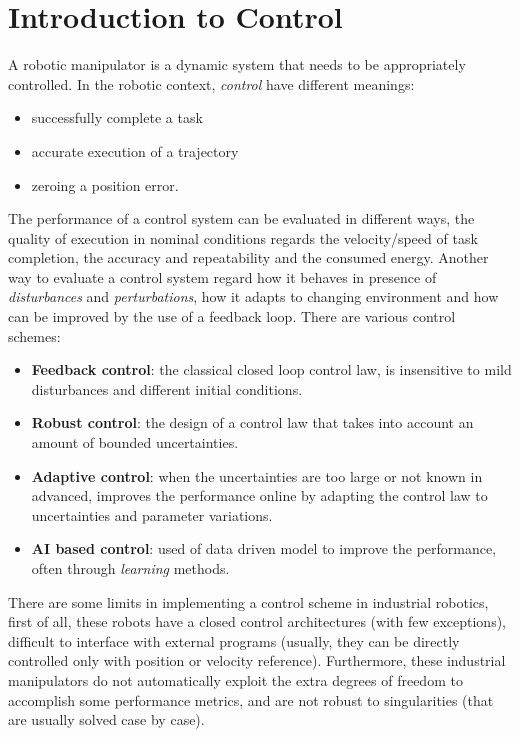 \documentclass[10pt, a4paper]{report}
\begin{document}
\chapter{Introduction to Control}
A robotic manipulator is a dynamic system that needs to be appropriately controlled. In the robotic context, \textit{control} have different meanings:\begin{itemize}
    \item successfully complete a task
    \item accurate execution of a trajectory 
    \item zeroing a position error. 
\end{itemize}
The performance of a control system can be evaluated in different ways, the quality of execution in nominal conditions regards the velocity/speed of task completion, the accuracy and repeatability and the consumed energy. Another way to evaluate a control system regard how it behaves in presence of \textit{disturbances} and \textit{perturbations}, how it adapts to changing environment and how can be improved by the use of a feedback loop. There are various control schemes:\begin{itemize}
    \item \textbf{Feedback control}: the classical closed loop control law, is insensitive to mild disturbances and different initial conditions.
    \item \textbf{Robust control}: the design of a control law that takes into account an amount of bounded uncertainties.
    \item \textbf{Adaptive control}: when the uncertainties are too large or not known in advanced, improves the performance online by adapting the control law to uncertainties and parameter variations.
    \item \textbf{AI based control}: used of data driven model to improve the performance, often through \textit{learning} methods.
\end{itemize}
There are some limits in implementing a control scheme in industrial robotics, first of all, these robots have a closed control architectures (with few exceptions), difficult to interface with external programs (usually, they can be directly controlled only with position or velocity reference). Furthermore, these industrial manipulators do not  automatically exploit the extra degrees of freedom to accomplish some performance metrics, and are not robust to singularities (that are usually solved case by case).
\end{document}
